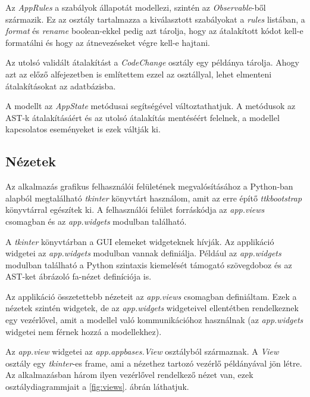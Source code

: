 Az \emph{AppRules} a szabályok állapotát modellezi, szintén az \emph{Observable}-ből
származik.
Ez az osztály tartalmazza a kiválasztott szabályokat a \emph{rules} listában,
a \emph{format} és \emph{rename} boolean-ekkel pedig azt tárolja, hogy az átalakított
kódot kell-e formatálni és hogy az átnevezéseket végre kell-e hajtani.

\pagebreak

Az utolsó validált átalakítást a \emph{CodeChange} osztály egy példánya tárolja.
Ahogy azt az előző alfejezetben is említettem ezzel az osztállyal,
lehet elmenteni átalakításokat az adatbázisba.

A modellt az \emph{AppState} metódusai segítségével változtathatjuk.
A metódusok az AST-k átalakításáért és az utolsó átalakítás mentéséért felelnek,
a modellel kapcsolatos eseményeket is ezek váltják ki.

\subsection{Nézetek}

Az alkalmazás grafikus felhasználói felületének megvalósításához
a Python-ban alapból megtalálható
\emph{tkinter} könyvtárt használom, amit az erre építő \emph{ttkbootstrap} könyvtárral
egészítek ki.
A felhasználói felület forráskódja az \emph{app.views} csomagban és az \emph{app.widgets}
modulban található.

A \emph{tkinter} könyvtárban a GUI elemeket widgeteknek hívják.
Az applikáció widgetei az \emph{app.widgets} modulban vannak definiálja.
Például az \emph{app.widgets} modulban található
a Python szintaxis kiemelését támogató szövegdoboz
és az AST-ket ábrázoló fa-nézet definíciója is.

Az applikáció összetettebb nézeteit az \emph{app.views} csomagban definiáltam.
Ezek a nézetek szintén widgetek,
de az \emph{app.widgets} widgeteivel ellentétben rendelkeznek egy vezérlővel,
amit a modellel való kommunikációhoz használnak
(az \emph{app.widgets} widgetei nem férnek hozzá a modellekhez).

Az \emph{app.view} widgetei az \emph{app.appbases.View} osztályból származnak.
A \emph{View} osztály egy \emph{tkinter}-es frame, ami a nézethez tartozó 
vezérlő példányával jön létre.
Az alkalmazásban három ilyen vezérlővel rendelkező nézet van,
ezek osztálydiagrammjait a \ref{fig:views}. ábrán láthatjuk.

